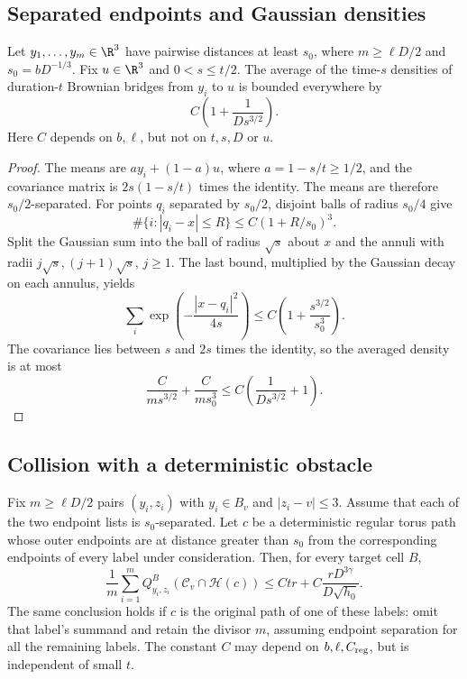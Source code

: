 \subsection{Separated endpoints and Gaussian densities}

\begin{lemma}\label{lem:gaussian-packing}
Let $y_1,\ldots,y_m\in\R^3$ have pairwise distances at least $s_0$, where
$m\ge\ell D/2$ and $s_0=bD^{-1/3}$.  Fix $u\in\R^3$ and
$0<s\le t/2$.  The average of the time-$s$ densities of duration-$t$
Brownian bridges from $y_i$ to $u$ is bounded everywhere by
\begin{equation}\label{bridge:packed-density}
 C\left(1+\frac{1}{D s^{3/2}}\right).
\end{equation}
Here $C$ depends on $b,\ell$, but not on $t,s,D$ or $u$.
\end{lemma}

\begin{proof}
The means are $a y_i+(1-a)u$, where $a=1-s/t\ge1/2$, and the covariance
matrix is $2s(1-s/t)$ times the identity.  The means are therefore
$s_0/2$-separated.  For points $q_i$ separated by $s_0/2$, disjoint balls
of radius $s_0/4$ give
\[
 \#\{i:|q_i-x|\le R\}\le C(1+R/s_0)^3.
\]
Split the Gaussian sum into the ball of radius $\sqrt{s}$ about $x$ and
the annuli with radii $j\sqrt{s},(j+1)\sqrt{s}$, $j\ge1$.  The last
bound, multiplied by the Gaussian decay on each annulus, yields
\[
 \sum_i \exp\!\left(-\frac{|x-q_i|^2}{4s}\right)
 \le C\left(1+\frac{s^{3/2}}{s_0^3}\right).
\]
The covariance lies between $s$ and $2s$ times the identity, so the
averaged density is at most
\[
 \frac{C}{m s^{3/2}}+\frac{C}{m s_0^3}
 \le C\left(\frac{1}{D s^{3/2}}+1\right).
\]
\end{proof}

\subsection{Collision with a deterministic obstacle}

\begin{lemma}\label{lem:averaged-hit}
Fix $m\ge\ell D/2$ pairs $(y_i,z_i)$ with $y_i\in B_v$ and
$|z_i-v|\le3$.  Assume that each of the two endpoint lists is
$s_0$-separated.  Let $c$ be a deterministic regular torus path whose
outer endpoints are at distance greater than $s_0$ from the corresponding
endpoints of every label under consideration.  Then, for every target
cell $B$,
\begin{equation}\label{bridge:averaged-estimate}
 \frac1m\sum_{i=1}^m
 Q_{y_i,z_i}^{B}(\mathcal C_v\cap\mathcal H(c))
 \le Ctr+C\frac{rD^{3\gamma}}{D\sqrt{h_0}}.
\end{equation}
The same conclusion holds if $c$ is the original path of one of these
labels: omit that label's summand and retain the divisor $m$, assuming
endpoint separation for all the remaining labels.  The constant $C$ may
depend on $b,\ell,C_{\rm reg}$, but is independent of small $t$.
\end{lemma}


